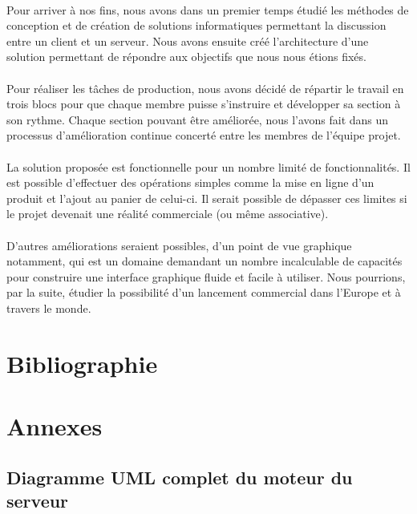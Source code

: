 \documentclass[a4paper, 12pt]{article}
\begin{document}
\paragraph{}Pour arriver à nos fins, nous avons dans un premier temps étudié les méthodes de conception et de création de solutions informatiques permettant la discussion entre un client et un serveur. Nous avons ensuite créé l’architecture d’une solution permettant de répondre aux objectifs que nous nous étions fixés.
\paragraph{}Pour réaliser les tâches de production, nous avons décidé de répartir le travail en trois blocs pour que chaque membre puisse s'instruire et développer sa section à son rythme. Chaque section pouvant être améliorée, nous l’avons fait dans un processus d’amélioration continue concerté entre les membres de l’équipe projet.
\paragraph{}La solution proposée est fonctionnelle pour un nombre limité de fonctionnalités. Il est possible d'effectuer des opérations simples comme la mise en ligne d’un produit et l’ajout au panier de celui-ci. Il serait possible de dépasser ces limites si le projet devenait une réalité commerciale (ou même associative).
\paragraph{}D’autres améliorations seraient possibles, d’un point de vue graphique notamment, qui est un domaine demandant un nombre incalculable de capacités pour construire une interface graphique fluide et facile à utiliser. Nous pourrions, par la suite, étudier la possibilité d’un lancement commercial dans l’Europe et à travers le monde.


\newpage
\section{Bibliographie}



\newpage
\section*{Annexes}
\subsection*{Diagramme UML complet du moteur du serveur}
\end{document}
